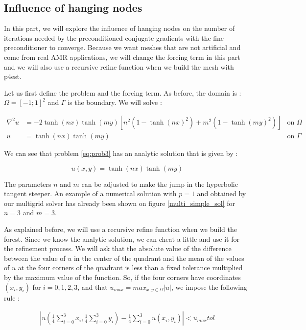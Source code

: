 \subsection{Influence of hanging nodes}
 In this part, we will explore the influence of hanging nodes on the number of iterations needed by the preconditioned conjugate gradients with the fine preconditioner to converge. Because we want meshes that are not artificial and come from real AMR applications, we will change the forcing term in this part and we will also use a recursive refine function when we build the mesh with p4est. 
 
 Let us first define the problem and the forcing term. As before, the domain is : $\Omega = [-1;1]^2$ and $\Gamma$ is the boundary. We will solve : 
 
 \begin{align}
 \nabla^2 u &= -2\tanh(nx)\tanh(my)\left[ n^2(1-\tanh(nx)^2) + m^2(1-\tanh(my)^2)\right] &\text{on $\Omega$} \label{eq:prob3}\\
u &= \tanh(nx)\tanh(my)  &\text{on $\Gamma$}
 \end{align}
 
 We can see that problem \ref{eq:prob3} has an analytic solution that is given by :
 
 $$u(x,y) = \tanh(nx)\tanh(my)$$
 
 The parameters $n$ and $m$ can be adjusted to make the jump in the hyperbolic tangent steeper. An example of a numerical solution with $p=1$ and obtained by our multigrid solver has already been shown on figure \ref{multi_simple_sol} for $n=3$ and $m=3$. 
 
 As explained before, we will use a recursive refine function when we build the forest. Since we know the analytic solution, we can cheat a little and use it for the refinement process. We will ask that the absolute value of the difference between the value of $u$ in the center of the quadrant and the mean of the values of $u$ at the four corners of the quadrant is less than a fixed tolerance multiplied by the maximum value of the function. So, if the four corners have coordinates $(x_i , y_i)$ for $i=0,1,2,3$, and that $u_{max} = max_{x,y \in \Omega} \left| u \right|$, we impose the following rule :
 
\begin{align}  
  \left| u(\frac{1}{4}\sum_{i=0}^3 x_i , \frac{1}{4}\sum_{i=0}^3 y_i) - \frac{1}{4}\sum_{i=0}^3 u(x_i,y_i)\right| < u_{max} tol
  \label{hang_rel}
\end{align}
  
